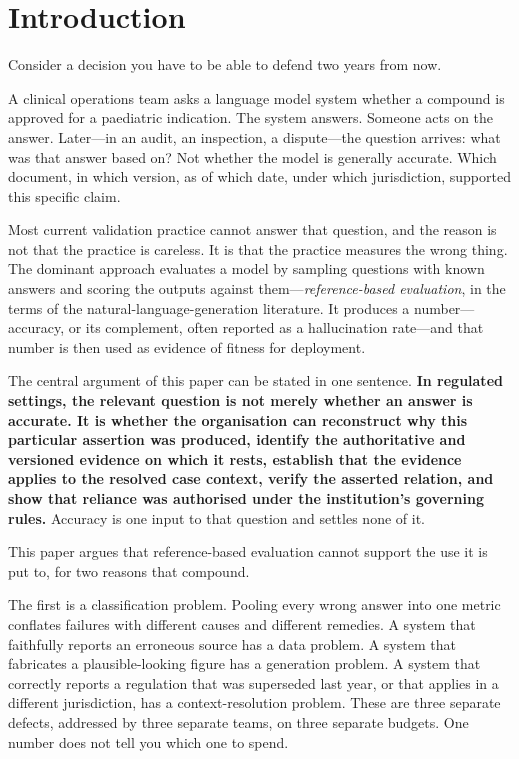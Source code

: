 \section{Introduction}
\label{sec:intro}

Consider a decision you have to be able to defend two years from now.

A clinical operations team asks a language model system whether a compound is
approved for a paediatric indication. The system answers. Someone acts on the
answer. Later---in an audit, an inspection, a dispute---the question arrives:
what was that answer based on? Not whether the model is generally accurate. Which
document, in which version, as of which date, under which jurisdiction, supported
this specific claim.

Most current validation practice cannot answer that question, and the reason is
not that the practice is careless. It is that the practice measures the wrong
thing. The dominant approach evaluates a model by sampling questions with known
answers and scoring the outputs against them---\emph{reference-based evaluation},
in the terms of the natural-language-generation literature. It produces a
number---accuracy, or its complement, often reported as a hallucination
rate---and that number is then used as evidence of fitness for deployment.

The central argument of this paper can be stated in one sentence. \textbf{In
regulated settings, the relevant question is not merely whether an answer is
accurate. It is whether the organisation can reconstruct why this particular
assertion was produced, identify the authoritative and versioned evidence on which
it rests, establish that the evidence applies to the resolved case context, verify
the asserted relation, and show that reliance was authorised under the institution's
governing rules.} Accuracy is one input to that question and settles none of it.

This paper argues that reference-based evaluation cannot support the use it is put
to,
for two reasons that compound.

The first is a classification problem. Pooling every wrong answer into one
metric conflates failures with different causes and different remedies. A system
that faithfully reports an erroneous source has a data problem. A system that
fabricates a plausible-looking figure has a generation problem. A system that
correctly reports a regulation that was superseded last year, or that applies in
a different jurisdiction, has a context-resolution problem. These are three
separate defects, addressed by three separate teams, on three separate budgets.
One number does not tell you which one to spend.

